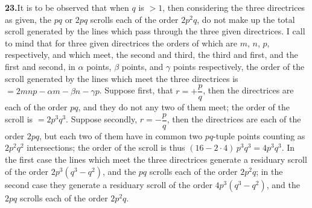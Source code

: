 \documentclass[11pt,a4paper]{article}
\begin{document}
\textbf{23.}\quad It is to be observed that when $q$ is $> 1$, then considering
the three directrices as given, the $pq$ or $2pq$ scrolls each of the order
$2p^{2}q$, do not make up the total scroll generated by the lines which pass
through the three given directrices. I call to mind that for three given
directrices the orders of which are $m$, $n$, $p$, respectively, and which
meet, the second and third, the third and first, and the first and second, in
$\alpha$ points, $\beta$ points, and $\gamma$ points respectively, the order
of the scroll generated by the lines which meet the three directrices is
$= 2 m n p - \alpha m - \beta n - \gamma p$. Suppose first, that $r = +\dfrac{p}{q}$,
then the directrices are each of the order $pq$, and they do not any two of them
meet; the order of the scroll is $= 2p^{3}q^{3}$. Suppose secondly,
$r = -\dfrac{p}{q}$, then the directrices are each of the order $2pq$, but each
two of them have in common two $pq$-tuple points counting as $2p^{2}q^{2}$
intersections; the order of the scroll is thus
$(16 - 2 \cdot 4)\,p^{3}q^{3} = 4p^{3}q^{3}$. In the first case the lines which
meet the three directrices generate a residuary scroll of the order
$2p^{3}(q^{3} - q^{2})$, and the $pq$ scrolls each of the order $2p^{2}q$; in
the second case they generate a residuary scroll of the order $4p^{3}(q^{3} - q^{2})$,
and the $2pq$ scrolls each of the order $2p^{2}q$.
\end{document}
